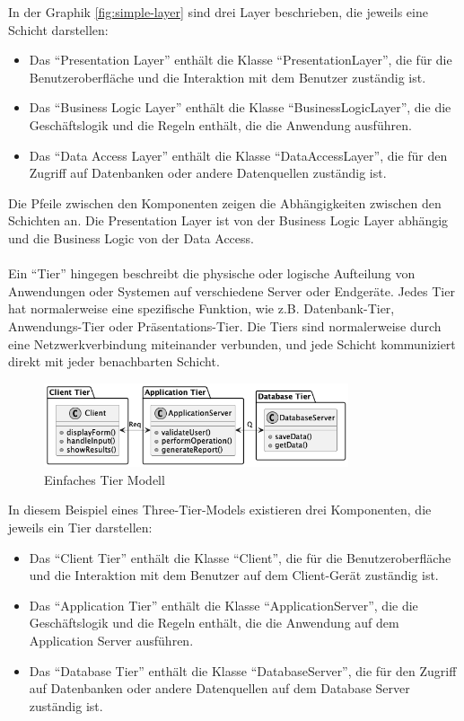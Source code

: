 \documentclass[../vs-script-first-v01.tex]{subfiles}
\begin{document}
In der Graphik \ref{fig:simple-layer} sind drei Layer beschrieben, die jeweils eine Schicht darstellen:
\begin{itemize}
\item Das \enquote{Presentation Layer} enthält die Klasse \enquote{PresentationLayer}, die für die Benutzeroberfläche und die Interaktion mit dem Benutzer zuständig ist.

\item Das \enquote{Business Logic Layer} enthält die Klasse \enquote{BusinessLogicLayer}, die die Geschäftslogik und die Regeln enthält, die die Anwendung ausführen.

\item Das \enquote{Data Access Layer} enthält die Klasse \enquote{DataAccessLayer}, die für den Zugriff auf Datenbanken oder andere Datenquellen zuständig ist.
\end{itemize}
Die Pfeile zwischen den Komponenten zeigen die Abhängigkeiten zwischen den Schichten an. Die Presentation Layer ist von der Business Logic Layer abhängig und die Business Logic von der Data Access.
\\\\
Ein \enquote{Tier} hingegen beschreibt die physische oder logische Aufteilung von Anwendungen oder Systemen auf verschiedene Server oder Endgeräte. Jedes Tier hat normalerweise eine spezifische Funktion, wie z.B. Datenbank-Tier, Anwendungs-Tier oder Präsentations-Tier. Die Tiers sind normalerweise durch eine Netzwerkverbindung miteinander verbunden, und jede Schicht kommuniziert direkt mit jeder benachbarten Schicht.
\begin{figure}[!h]
  \centering
  \includegraphics[width=0.80\textwidth]{fig/uml/simple-tiers.png}
  \caption{Einfaches Tier Modell}
  \label{fig:simple-tier}
\end{figure}
In diesem Beispiel eines Three-Tier-Models existieren drei Komponenten, die jeweils ein Tier darstellen:
\begin{itemize}
\item Das \enquote{Client Tier} enthält die Klasse \enquote{Client}, die für die Benutzeroberfläche und die Interaktion mit dem Benutzer auf dem Client-Gerät zuständig ist.

\item Das \enquote{Application Tier} enthält die Klasse \enquote{ApplicationServer}, die die Geschäftslogik und die Regeln enthält, die die Anwendung auf dem Application Server ausführen.

\item Das \enquote{Database Tier} enthält die Klasse \enquote{DatabaseServer}, die für den Zugriff auf Datenbanken oder andere Datenquellen auf dem Database Server zuständig ist.
\end{itemize}
\end{document}
